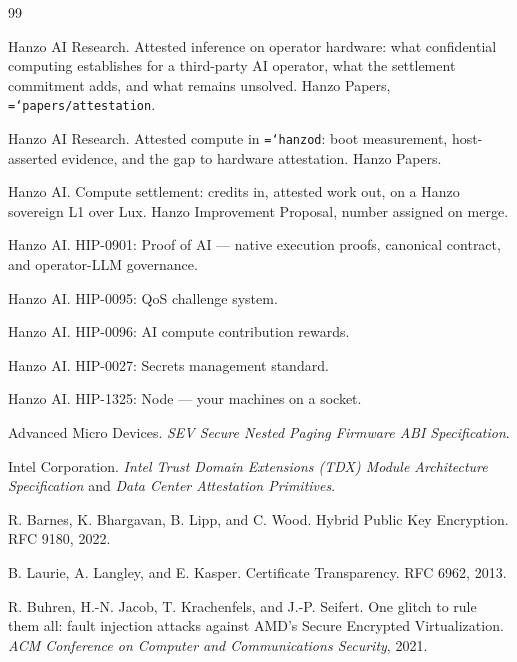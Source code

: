 \documentclass[11pt,a4paper]{article}
\newcommand{\code}[1]{\texttt{\hyphenchar\font=`\-\relax #1}}
\begin{document}
\begin{thebibliography}{99}

Hanzo AI Research.
\newblock Attested inference on operator hardware: what confidential computing
establishes for a third-party AI operator, what the settlement commitment adds, and
what remains unsolved.
\newblock Hanzo Papers, \code{papers/attestation}.

Hanzo AI Research.
\newblock Attested compute in \code{hanzod}: boot measurement, host-asserted
evidence, and the gap to hardware attestation.
\newblock Hanzo Papers.

Hanzo AI.
\newblock Compute settlement: credits in, attested work out, on a Hanzo sovereign L1
over Lux.
\newblock Hanzo Improvement Proposal, number assigned on merge.

Hanzo AI.
\newblock HIP-0901: Proof of AI --- native execution proofs, canonical contract, and
operator-LLM governance.

Hanzo AI.
\newblock HIP-0095: QoS challenge system.

Hanzo AI.
\newblock HIP-0096: AI compute contribution rewards.

Hanzo AI.
\newblock HIP-0027: Secrets management standard.

Hanzo AI.
\newblock HIP-1325: Node --- your machines on a socket.

Advanced Micro Devices.
\newblock \emph{SEV Secure Nested Paging Firmware ABI Specification}.

Intel Corporation.
\newblock \emph{Intel Trust Domain Extensions (TDX) Module Architecture
Specification} and \emph{Data Center Attestation Primitives}.

R. Barnes, K. Bhargavan, B. Lipp, and C. Wood.
\newblock Hybrid Public Key Encryption.
\newblock RFC 9180, 2022.

B. Laurie, A. Langley, and E. Kasper.
\newblock Certificate Transparency.
\newblock RFC 6962, 2013.

R. Buhren, H.-N. Jacob, T. Krachenfels, and J.-P. Seifert.
\newblock One glitch to rule them all: fault injection attacks against AMD's Secure
Encrypted Virtualization.
\newblock \emph{ACM Conference on Computer and Communications Security}, 2021.


\end{thebibliography}
\end{document}
